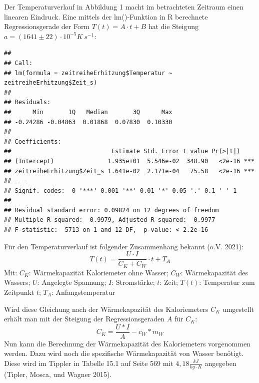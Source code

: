 \documentclass[class=article, crop=false]{standalone}
\newenvironment{Shaded}{\begin{snugshade}}{\end{snugshade}}
\newcommand{\CommentTok}[1]{\textcolor[rgb]{0.56,0.35,0.01}{\textit{#1}}}
\newcommand{\FunctionTok}[1]{\textcolor[rgb]{0.00,0.00,0.00}{#1}}
\newcommand{\NormalTok}[1]{#1}
\newcommand{\OtherTok}[1]{\textcolor[rgb]{0.56,0.35,0.01}{#1}}
\newcommand{\SpecialCharTok}[1]{\textcolor[rgb]{0.00,0.00,0.00}{#1}}
\begin{document}
Der Temperaturverlauf in Abbildung 1 macht im betrachteten Zeitraum
einen linearen Eindruck. Eine mittels der lm()-Funktion in R berechnete
Regressionsgerade der Form \(T(t)=A\cdot t+B\) hat die Steigung
\(a=(1641\pm 22)\cdot 10^{-5}K\ s^{-1}\):

\begin{Shaded}
\end{Shaded}

\begin{verbatim}
## 
## Call:
## lm(formula = zeitreiheErhitzung$Temperatur ~ zeitreiheErhitzung$Zeit_s)
## 
## Residuals:
##      Min       1Q   Median       3Q      Max 
## -0.24286 -0.04863  0.01868  0.07830  0.10330 
## 
## Coefficients:
##                            Estimate Std. Error t value Pr(>|t|)    
## (Intercept)               1.935e+01  5.546e-02  348.90   <2e-16 ***
## zeitreiheErhitzung$Zeit_s 1.641e-02  2.171e-04   75.58   <2e-16 ***
## ---
## Signif. codes:  0 '***' 0.001 '**' 0.01 '*' 0.05 '.' 0.1 ' ' 1
## 
## Residual standard error: 0.09824 on 12 degrees of freedom
## Multiple R-squared:  0.9979, Adjusted R-squared:  0.9977 
## F-statistic:  5713 on 1 and 12 DF,  p-value: < 2.2e-16
\end{verbatim}

Für den Temperaturverlauf ist folgender Zusammenhang bekannt (o.V.
2021): \[T(t) = \frac{U\cdot I}{C_K + C_W}\cdot t + T_A\] Mit: \(C_K\):
Wärmekapazität Kaloriemeter ohne Wasser; \(C_W\): Wärmekapazität des
Wassers; \(U\): Angelegte Spannung; \(I\): Stromstärke; \(t\): Zeit;
\(T(t)\): Temperatur zum Zeitpunkt \(t\); \(T_A\): Anfangstemperatur

Wird diese Gleichung nach der Wärmekapazität des Kaloriemeters \(C_K\)
umgestellt erhält man mit der Steigung der Regressionsgeraden \(A\) für
\(C_K\): \[C_K = \frac{U*I}{A}-c_W*m_W\] Nun kann die Berechnung der
Wärmekapazität des Kaloriemeters vorgenommen werden. Dazu wird noch die
spezifische Wärmekapazität von Wasser benötigt. Diese wird im Tippler in
Tabelle 15.1 auf Seite 569 mit \(4,18 \frac{kJ}{kg\cdot K}\) angegeben
(Tipler, Mosca, und Wagner 2015).
\end{document}
